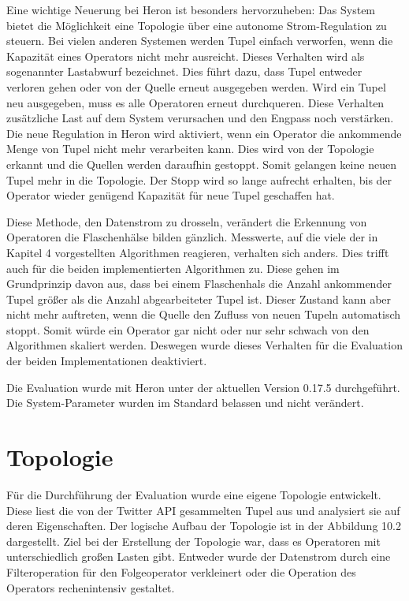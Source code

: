 Eine wichtige Neuerung bei Heron ist besonders hervorzuheben:
Das System bietet die Möglichkeit eine Topologie über eine autonome Strom-Regulation zu steuern.
Bei vielen anderen Systemen werden Tupel einfach verworfen, wenn die Kapazität eines Operators nicht mehr ausreicht.
Dieses Verhalten wird als sogenannter Lastabwurf bezeichnet.
Dies führt dazu, dass Tupel entweder verloren gehen oder von der Quelle erneut ausgegeben werden.
Wird ein Tupel neu ausgegeben, muss es alle Operatoren erneut durchqueren.
Diese Verhalten zusätzliche Last auf dem System verursachen und den Engpass noch verstärken.
Die neue Regulation in Heron wird aktiviert, wenn ein Operator die ankommende Menge von Tupel nicht mehr verarbeiten kann.
Dies wird von der Topologie erkannt und die Quellen werden daraufhin gestoppt.
Somit gelangen keine neuen Tupel mehr in die Topologie.
Der Stopp wird so lange aufrecht erhalten, bis der Operator wieder genügend Kapazität für neue Tupel geschaffen hat.

Diese Methode, den Datenstrom zu drosseln, verändert die Erkennung von Operatoren die Flaschenhälse bilden gänzlich.
Messwerte, auf die viele der in Kapitel 4 vorgestellten Algorithmen reagieren, verhalten sich anders.
Dies trifft auch für die beiden implementierten Algorithmen zu.
Diese gehen im Grundprinzip davon aus, dass bei einem Flaschenhals die Anzahl ankommender Tupel größer als die Anzahl abgearbeiteter Tupel ist.
Dieser Zustand kann aber nicht mehr auftreten, wenn die Quelle den Zufluss von neuen Tupeln automatisch stoppt.
Somit würde ein Operator gar nicht oder nur sehr schwach von den Algorithmen skaliert werden.
Deswegen wurde dieses Verhalten für die Evaluation der beiden Implementationen deaktiviert.

Die Evaluation wurde mit Heron unter der aktuellen Version 0.17.5 durchgeführt.
Die System-Parameter wurden im Standard belassen und nicht verändert.

\section{Topologie}

Für die Durchführung der Evaluation wurde eine eigene Topologie entwickelt.
Diese liest die von der Twitter API gesammelten Tupel aus und analysiert sie auf deren Eigenschaften.
Der logische Aufbau der Topologie ist in der Abbildung 10.2 dargestellt.
Ziel bei der Erstellung der Topologie war, dass es Operatoren mit unterschiedlich großen Lasten gibt.
Entweder wurde der Datenstrom durch eine Filteroperation für den Folgeoperator verkleinert oder die Operation des Operators rechenintensiv gestaltet.

